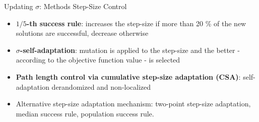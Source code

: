 \documentclass[11pt,compress,t,notes=noshow, xcolor=table]{beamer}
\begin{document}
\begin{vbframe}{Updating $\sigma$: Methods Step-Size Control}
\begin{itemize}
\item \textbf{$1/5$-th success rule}: increases the step-size if more than 20 \% of the new solutions are successful, decrease otherwise
\item \textbf{$\sigma$-self-adaptation}: mutation is applied to the step-size and the better - according to the objective function value - is selected
\item \textbf{Path length control via cumulative step-size adaptation (CSA)}: self-adaptation derandomized and non-localized
\item Alternative step-size adaptation mechanism: two-point step-size adaptation, median success rule, population success rule.
\end{itemize}
\end{vbframe}
\end{document}
